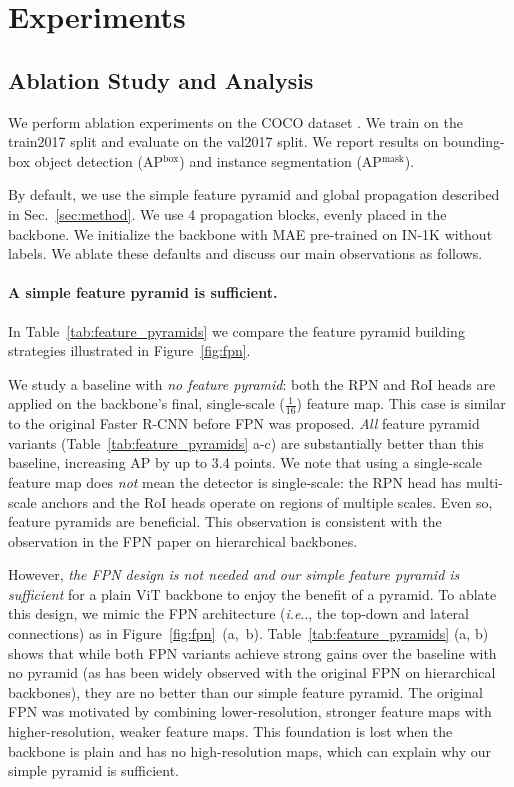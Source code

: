 \documentclass[runningheads]{llncs}
\makeatletter
\DeclareRobustCommand\onedot{\futurelet\@let@token\@onedot}
\def\@onedot{\ifx\@let@token.\else.\null\fi\xspace}
\def\ie{\emph{i.e}\onedot} \def\Ie{\emph{I.e}\onedot}
\makeatother
\begin{document}
\section{Experiments} \label{sec:exp}

\subsection{Ablation Study and Analysis} \label{subsec:ablation}

We perform ablation experiments on the COCO dataset \cite{Lin2014}. We train on the \textsf{train2017} split and evaluate on the \textsf{val2017} split. We report results on bounding-box object detection (AP$^\text{box}$) and instance segmentation (AP$^\text{mask}$).

By default, we use the simple feature pyramid and global propagation described in Sec.~\ref{sec:method}. We use 4 propagation blocks, evenly placed in the backbone. We initialize the backbone with MAE \cite{He2021} pre-trained on IN-1K without labels. We ablate these defaults and discuss our main observations as follows.

\paragraph{A simple feature pyramid is sufficient.} In Table~\ref{tab:feature_pyramids} we compare the feature pyramid building strategies illustrated in Figure~\ref{fig:fpn}.

We study a baseline with \textit{no feature pyramid}: both the RPN and RoI heads are applied on the backbone's final, single-scale ($\frac{1}{16}$) feature map. This case is similar to the original Faster R-CNN \cite{Ren2015} before FPN was proposed. \textit{All} feature pyramid variants (Table~\ref{tab:feature_pyramids} a-c) are substantially better than this baseline, increasing AP by up to 3.4 points. We note that using a single-scale feature map does \textit{not} mean the detector is single-scale: the RPN head has multi-scale anchors and the RoI heads operate on regions of multiple scales. Even so, feature pyramids are beneficial. This observation is consistent with the observation in the FPN paper \cite{Lin2017} on hierarchical backbones.

However, \textit{the FPN design is not needed and our simple feature pyramid is sufficient} for a plain ViT backbone to enjoy the benefit of a pyramid. To ablate this design, we mimic the FPN architecture (\ie, the top-down and lateral connections) as in Figure~\mbox{\ref{fig:fpn} (a, b)}. 
Table~\ref{tab:feature_pyramids} (a, b) shows that
while both FPN variants achieve strong gains over the baseline with no pyramid (as has been widely observed with the original FPN on hierarchical backbones), they are no better than our simple feature pyramid.
The original FPN \cite{Lin2017} was motivated by combining lower-resolution, stronger feature maps with higher-resolution, weaker feature maps. This foundation is lost when the backbone is plain and has no high-resolution maps, which can explain why our simple pyramid is sufficient.
\end{document}
